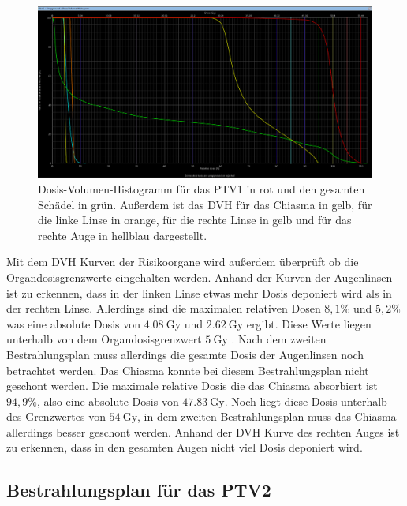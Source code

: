\begin{figure}[H]
  \centering
  \includegraphics[width=\textwidth]{Bilder/Teilhirn1_DVH.png}
  \caption{Dosis-Volumen-Histogramm für das PTV1 in rot und den gesamten Schädel in grün. Außerdem ist das DVH für das Chiasma in gelb, für die linke Linse in orange, für die rechte Linse in gelb und für das rechte Auge in hellblau dargestellt.}
  \label{abb:DVH}
\end{figure}

Mit dem DVH Kurven der Risikoorgane wird außerdem überprüft ob die Organdosisgrenzwerte eingehalten werden.
Anhand der Kurven der Augenlinsen ist zu erkennen, dass in der linken Linse etwas mehr Dosis deponiert wird
als in der rechten Linse. Allerdings sind die maximalen relativen Dosen $8,1\%$ und $5,2\%$ was eine absolute Dosis von
$\SI{4.08}{\gray}$ und $\SI{2.62}{\gray}$ ergibt. Diese Werte liegen unterhalb von dem Organdosisgrenzwert
$\SI{5}{\gray}$ \cite{grenz}. Nach dem zweiten Bestrahlungsplan muss allerdings die gesamte Dosis der Augenlinsen noch betrachtet werden.
Das Chiasma konnte bei diesem Bestrahlungsplan nicht geschont werden. Die maximale relative Dosis die das Chiasma absorbiert ist
$94,9\%$, also eine absolute Dosis von $\SI{47.83}{\gray}$. Noch liegt diese Dosis unterhalb des Grenzwertes von
$\SI{54}{\gray}$, in dem zweiten Bestrahlungsplan muss das Chiasma allerdings besser geschont werden.
Anhand der DVH Kurve des rechten Auges ist zu erkennen, dass in den gesamten Augen nicht viel Dosis deponiert wird.


\subsection*{Bestrahlungsplan für das PTV2}

